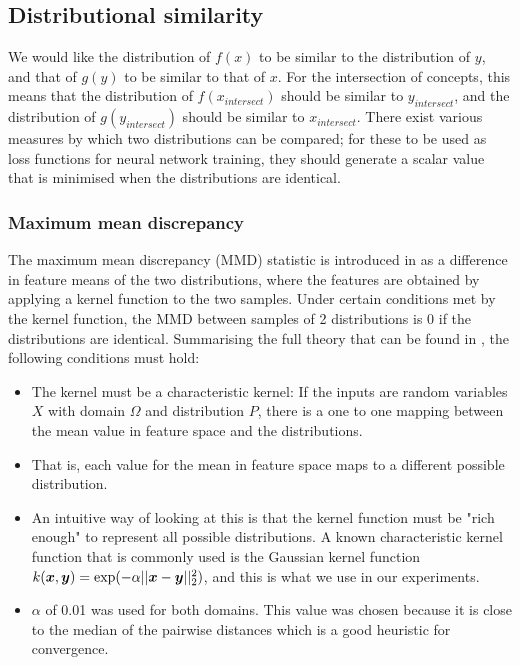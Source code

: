 
\subsection{Distributional similarity}

We would like the distribution of $f(x)$ to be similar to the distribution of $y$, and that of $g(y)$ to be similar to that of $x$. For the intersection of concepts, this means that the distribution of $f(x_{intersect})$ should be similar to $y_{intersect}$, and the distribution of $g(y_{intersect})$ should be similar to $x_{intersect}$. There exist various measures by which two distributions can be compared; for these to be used as loss functions for neural network training, they should generate a scalar value that is minimised when the distributions are identical. 


\subsubsection{Maximum mean discrepancy}

The maximum mean discrepancy (MMD) statistic is introduced in \cite{MMDGretton} as a difference in feature means of the two distributions, where the features are obtained by applying a kernel function to the two samples. Under certain conditions met by the kernel function, the MMD between samples of 2 distributions is 0 if the distributions are identical. Summarising the full theory that can be found in \cite{MMDGretton}, the following conditions must hold:

\begin{itemize}
    \item The kernel must be a characteristic kernel: If the inputs are random variables $X$ with domain $\Omega$ and distribution $P$, there is a one to one mapping between the mean value in feature space and the distributions. \cite{KernelMeanEmbeddingReview} 
    \item That is, each value for the mean in feature space maps to a different possible distribution. 
    \item An intuitive way of looking at this is that the kernel function must be "rich enough" to represent all possible distributions. A known characteristic kernel function that is commonly used is the Gaussian kernel function $k(\boldsymbol{x}, \boldsymbol{y}) = \exp(-\alpha ||\boldsymbol{x} - \boldsymbol{y}||_2^2)$, and this is what we use in our experiments. 
    \item $\alpha$ of 0.01 was used for both domains. This value was chosen because it is close to the median of the pairwise distances  which is a good heuristic for convergence. 
\end{itemize}

